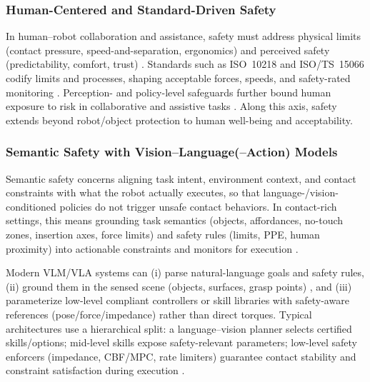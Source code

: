 \documentclass[Afour,sageh,times]{template/sagej}
\begin{document}
\subsubsection{Human-Centered and Standard-Driven Safety}
In human–robot collaboration and assistance, safety must address physical limits (contact pressure, speed-and-separation, ergonomics) and perceived safety (predictability, comfort, trust) \citep{ajoudani2018progress,52}. Standards such as ISO~10218 and ISO/TS~15066 codify limits and processes, shaping acceptable forces, speeds, and safety-rated monitoring \citep{280,lakshminarayanan2024robots}. Perception- and policy-level safeguards further bound human exposure to risk in collaborative and assistive tasks \citep{zhao2021efficientHRC,el2020towardsICRA,57,9}. Along this axis, safety extends beyond robot/object protection to human well-being and acceptability.

\subsubsection{Semantic Safety with Vision–Language(–Action) Models}
Semantic safety concerns aligning task intent, environment context, and contact constraints with what the robot actually executes, so that language-/vision-conditioned policies do not trigger unsafe contact behaviors. In contact-rich settings, this means grounding task semantics (objects, affordances, no-touch zones, insertion axes, force limits) and safety rules (limits, PPE, human proximity) into actionable constraints and monitors for execution \citep{yuan2022safe}.

Modern VLM/VLA systems can (i) parse natural-language goals and safety rules, (ii) ground them in the sensed scene (objects, surfaces, grasp points) \citep{10705419,33,51}, and (iii) parameterize low-level compliant controllers or skill libraries with safety-aware references (pose/force/impedance) \citep{330,zhou_physvlm_2025,wei_audio-vla_2025} rather than direct torques. Typical architectures use a hierarchical split: a language–vision planner selects certified skills/options; mid-level skills expose safety-relevant parameters; low-level safety enforcers (impedance, CBF/MPC, rate limiters) guarantee contact stability and constraint satisfaction during execution \citep{wei_audio-vla_2025,cui_end--end_nodate,lu_vla-rl_2025,376}.
\end{document}
